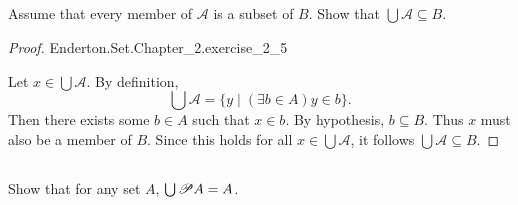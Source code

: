 \documentclass{report}
\begin{document}
\subsection{}%
\label{sub:exercise-2.5}

Assume that every member of $\mathscr{A}$ is a subset of $B$.
Show that $\bigcup \mathscr{A} \subseteq B$.

\begin{proof}

    {Enderton.Set.Chapter\_2.exercise\_2\_5}

  Let $x \in \bigcup \mathscr{A}$.
  By definition,
    $$\bigcup \mathscr{A} = \{ y \mid (\exists b \in A)y \in b \}.$$
  Then there exists some $b \in A$ such that $x \in b$.
  By hypothesis, $b \subseteq B$.
  Thus $x$ must also be a member of $B$.
  Since this holds for all $x \in \bigcup \mathscr{A}$, it follows
    $\bigcup \mathscr{A} \subseteq B$.

\end{proof}

\subsection{}%
\label{sub:exercise-2.6a}

Show that for any set $A$, $\bigcup \mathscr{P}A = A$.
\end{document}
